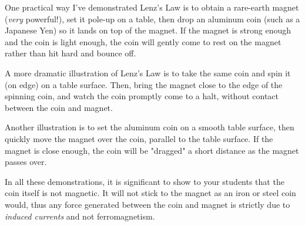 One practical way I've demonstrated Lenz's Law is to obtain a rare-earth magnet ({\it very} powerful!), set it pole-up on a table, then drop an aluminum coin (such as a Japanese Yen) so it lands on top of the magnet.  If the magnet is strong enough and the coin is light enough, the coin will gently come to rest on the magnet rather than hit hard and bounce off.

A more dramatic illustration of Lenz's Law is to take the same coin and spin it (on edge) on a table surface.  Then, bring the magnet close to the edge of the spinning coin, and watch the coin promptly come to a halt, without contact between the coin and magnet.

Another illustration is to set the aluminum coin on a smooth table surface, then quickly move the magnet over the coin, parallel to the table surface.  If the magnet is close enough, the coin will be "dragged" a short distance as the magnet passes over.

In all these demonstrations, it is significant to show to your students that the coin itself is not magnetic.  It will not stick to the magnet as an iron or steel coin would, thus any force generated between the coin and magnet is strictly due to {\it induced currents} and not ferromagnetism.





